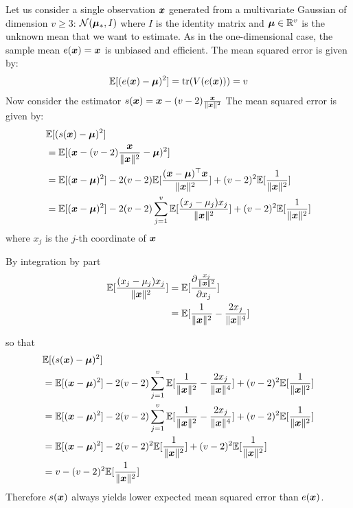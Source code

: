 \begin{example}
  \label{ex:stein}
  Let us consider a single observation $\xb$ generated from a multivariate Gaussian
  of dimension $v \geq 3$: $\Ncal(\mub_*, I)$ where $I$ is the identity matrix and
  $\mub \in \RR^v$ is the unknown mean that we want to estimate.
  As in the one-dimensional case, the sample mean $e(\xb) =\xb$ is unbiased and efficient.
  The mean squared error is given by:
  \begin{align}
    \EE[(e(\xb) - \mub)^2] = \tr(V(e(\xb))) = v
  \end{align}
  Now consider the estimator $s(\xb) = \xb - (v-2) \frac{\xb}{\|\xb\|^2}$
  The mean squared error is given by:
  \begin{align}
    &\EE[(s(\xb) - \mub)^2] \\ &= \EE[(\xb - (v-2) \frac{\xb}{\|\xb\|^2} - \mub)^2] \\
                        &= \EE[(\xb - \mub)^2] -2 (v-2)\EE[\frac{(\xb - \mub)^{\top}\xb}{\|\xb\|^2}] + (v-2)^2 \EE[\frac1{\| \xb \|^2}] \\
                            &= \EE[(\xb - \mub)^2] -2 (v-2) \sum_{j=1}^v \EE[\frac{(x_j - \mu_j)x_j}{\|\xb\|^2}] + (v-2)^2 \EE[\frac1{\| \xb \|^2}]
  \end{align}
  where $x_j$ is the $j$-th coordinate of $\xb$

  By integration by part 
  \begin{align}
    \EE[\frac{(x_j - \mu_j)x_j}{\|\xb\|^2}] &= \EE[\partialfrac{x_j}{\frac{x_j}{\|\xb\|^2}}]  \\
    &= \EE[\frac1{\|\xb\|^2} - \frac{2x_j}{\|\xb\|^4}]
  \end{align}

  so that 
  \begin{align}
    &\EE[(s(\xb) - \mub)^2] \\
    &= \EE[(\xb - \mub)^2] -2 (v-2) \sum_{j=1}^v \EE[\frac1{\|\xb\|^2} - \frac{2x_j}{\|\xb\|^4}] + (v-2)^2 \EE[\frac1{\| \xb \|^2}] \\
    &= \EE[(\xb - \mub)^2] -2 (v-2) \sum_{j=1}^v \EE[\frac1{\|\xb\|^2} - \frac{2x_j}{\|\xb\|^4}] + (v-2)^2 \EE[\frac1{\| \xb \|^2}] \\
    &= \EE[(\xb - \mub)^2] -2 (v-2)^2 \EE[\frac1{\|\xb\|^2}] + (v-2)^2 \EE[\frac1{\| \xb \|^2}] \\
    &= v - (v-2)^2 \EE[\frac1{\|\xb\|^2}]
 \end{align}
 Therefore $s(\xb)$ always yields lower expected mean squared error than
 $e(\xb)$.
\end{example}

